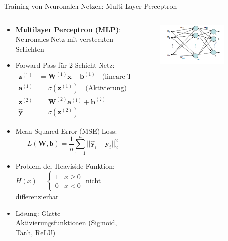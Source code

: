 \documentclass[aspectratio=1610, xcolor=dvipsnames, 9pt]{beamer}
\begin{document}
      \begin{frame}{Training von Neuronalen Netzen: Multi-Layer-Perceptron}
        \begin{columns}
          \begin{column}{0.7\textwidth}
            \begin{itemize}
              \item \textbf{Multilayer Perceptron (MLP)}: Neuronales Netz mit versteckten Schichten
              \item Forward-Pass für 2-Schicht-Netz:
              \begin{align}
                \mathbf{z}^{(1)} &= \mathbf{W}^{(1)} \mathbf{x} + \mathbf{b}^{(1)} \quad \text{(lineare Transformation)} \\
                \mathbf{a}^{(1)} &= \sigma(\mathbf{z}^{(1)}) \quad \text{(Aktivierung)} \\
                \mathbf{z}^{(2)} &= \mathbf{W}^{(2)} \mathbf{a}^{(1)} + \mathbf{b}^{(2)} \\
                \hat{\mathbf{y}} &= \sigma(\mathbf{z}^{(2)})
              \end{align}
              \item Mean Squared Error (MSE) Loss:
              \begin{equation}
                L(\mathbf{W}, \mathbf{b}) = \frac{1}{n} \sum_{i=1}^{n} ||\hat{\mathbf{y}}_i - \mathbf{y}_i||_2^2
              \end{equation}
              \item Problem der Heaviside-Funktion: $H(x) = \begin{cases}1 & x \geq 0\\0 & x < 0\end{cases}$ nicht differenzierbar
              \item Lösung: Glatte Aktivierungsfunktionen (Sigmoid, Tanh, ReLU)
            \end{itemize}
          \end{column}
          \begin{column}{0.3\textwidth}
            \begin{figure}
              \centering
                          \includegraphics[width=0.9\textwidth]{images/MLP.png}
              \end{figure}
          \end{column}
        \end{columns}
      \end{frame}
\end{document}
